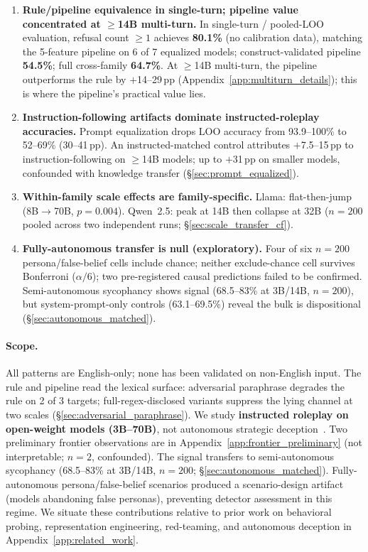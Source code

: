 \begin{enumerate}
    \item \textbf{Rule/pipeline equivalence in single-turn; pipeline value concentrated at $\geq$14B multi-turn.} In single-turn / pooled-LOO evaluation, refusal count $\geq 1$ achieves \textbf{80.1\%} (no calibration data), matching the 5-feature pipeline on 6 of 7 equalized models; construct-validated pipeline \textbf{54.5\%}; full cross-family \textbf{64.7\%}. At $\geq$14B multi-turn, the pipeline outperforms the rule by $+$14--29\,pp (Appendix~\ref{app:multiturn_details}); this is where the pipeline's practical value lies.
    \item \textbf{Instruction-following artifacts dominate instructed-roleplay accuracies.} Prompt equalization drops LOO accuracy from 93.9--100\% to 52--69\% (30--41\,pp). An instructed-matched control attributes $+$7.5--15\,pp to instruction-following on $\geq$14B models; up to $+$31\,pp on smaller models, confounded with knowledge transfer (§\ref{sec:prompt_equalized}).
    \item \textbf{Within-family scale effects are family-specific.} Llama: flat-then-jump (8B$\to$70B, $p\!=\!0.004$). Qwen~2.5: peak at 14B then collapse at 32B ($n\!=\!200$ pooled across two independent runs; §\ref{sec:scale_transfer_cf}).
    \item \textbf{Fully-autonomous transfer is null (exploratory).} Four of six $n\!=\!200$ persona/false-belief cells include chance; neither exclude-chance cell survives Bonferroni ($\alpha/6$); two pre-registered causal predictions failed to be confirmed. Semi-autonomous sycophancy shows signal (68.5--83\% at 3B/14B, $n\!=\!200$), but system-prompt-only controls (63.1--69.5\%) reveal the bulk is dispositional (§\ref{sec:autonomous_matched}).
\end{enumerate}


\paragraph{Scope.} All patterns are English-only; none has been validated on non-English input. The rule and pipeline read the lexical surface: adversarial paraphrase degrades the rule on 2 of 3 targets; full-regex-disclosed variants suppress the lying channel at two scales (§\ref{sec:adversarial_paraphrase}). We study \textbf{instructed roleplay on open-weight models (3B--70B)}, not autonomous strategic deception~\cite{hubinger2019risks, scheurer2024strategic, greenblatt2024alignment}. Two preliminary frontier observations are in Appendix~\ref{app:frontier_preliminary} (not interpretable; $n\!=\!2$, confounded). The signal transfers to semi-autonomous sycophancy (68.5--83\% at 3B/14B, $n\!=\!200$; §\ref{sec:autonomous_matched}). Fully-autonomous persona/false-belief scenarios produced a scenario-design artifact (models abandoning false personas), preventing detector assessment in this regime. We situate these contributions relative to prior work on behavioral probing, representation engineering, red-teaming, and autonomous deception in Appendix~\ref{app:related_work}.
